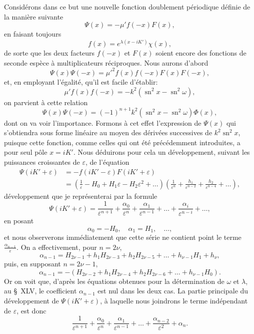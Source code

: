 \documentclass[11pt,leqno,oneside,letterpaper]{book}[2005/09/16]
\DeclareMathOperator{\sn}{sn}
\begin{document}
Consid\'erons dans ce but une nouvelle fonction doublement p\'eriodique
d\'efinie de la mani\`ere suivante
\[
\Psi(x) = -\mu' f(-x)F(x),
\]
en faisant toujours
\[
f(x) = e^{\lambda(x-iK')}\chi(x),
\]
de sorte que les deux facteurs $f(-x)$ et $F(x)$ soient encore des fonctions de
seconde esp\`ece \`a multiplicateurs r\'eciproques. Nous aurons d'abord
\[
\Psi(x)\Psi(-x) = \mu'^2 f(x)f(-x)F(x)F(-x),
\]
et, en employant l'\'egalit\'e, qu'il est facile d'\'etablir:
\[
\mu'f(x)f(-x) = -k^2(\sn^2x - \sn^2\omega),
\]
on parvient \`a cette relation
\[
\Psi(x)\Psi(-x) = (-1)^{n+1}k^2
  \left(\sn^2x-\sn^2\omega\right) \Phi(x),
\]
dont on va voir l'importance. Formons \`a cet effet l'expression de $\Psi(x)$
qui s'obtiendra sous forme lin\'eaire au moyen des d\'eriv\'ees successives
de $k^2\sn^2 x$, puisque cette fonction, comme celles qui ont \'et\'e pr\'ec\'edemment
introduites, a pour seul p\^ole $x = iK'$. Nous d\'eduirons pour cela un
d\'eveloppement, suivant les puissances croissantes de $\varepsilon$, de l'\'equation
\begin{align*}
\Psi(iK'+\varepsilon) &= -f(iK'-\varepsilon)F(iK'+\varepsilon) \\
  &= \left( \frac{1}{\varepsilon}-H_0+H_1\varepsilon-H_2\varepsilon^2+\ldots\right)
     \left( \frac{1}{\varepsilon^n} + \frac{h_1}{\varepsilon^{n-2}} +
            \frac{h_2}{\varepsilon^{n-4}} + \ldots \right),
\end{align*}
d\'eveloppement que je repr\'esenterai par la formule
\[
\Psi(iK'+\varepsilon) = \frac{1}{\varepsilon^{n+1}} + \frac{\alpha_0}{\varepsilon^n} +
  \frac{\alpha_1}{\varepsilon^{n-1}} + \ldots + \frac{\alpha_i}{\varepsilon^{n-i}} + \ldots,
\]
en posant
\[
\alpha_0 = -H_0, \quad \alpha_1 = H_1, \quad \ldots,
\]
et nous observerons imm\'ediatement que cette s\'erie ne contient point le
terme $\frac{\alpha_{n-1}}{\varepsilon}$. On a effectivement, pour $n = 2\nu$,
\[
\alpha_{n-1} = H_{2\nu-1} + h_1H_{2\nu-3} + h_2H_{2\nu-5} +
  \ldots + h_{\nu-1}H_1+h_{\nu},
\]
puis, en supposant $n = 2\nu-1$,
\[
\alpha_{n-1} = -(H_{2\nu-2} + h_1H_{2\nu-4} + h_2H_{2\nu-6} + \ldots + h_{\nu-1}H_0).
\]
Or on voit que, d'apr\`es les \'equations obtenues pour la d\'etermination de $\omega$
et $\lambda$, au \S~XLV, le coefficient $\alpha_{n-1}$ est nul dans les deux cas. La partie
principale du d\'eveloppement de $\Psi(iK'+\varepsilon)$, \`a laquelle nous joindrons le
terme ind\'ependant de $\varepsilon$, est donc
\[
\frac{1}{\varepsilon^{n+1}} + \frac{\alpha_0}{\varepsilon^n}
  +\frac{\alpha_1}{\varepsilon^{n-1}} + \ldots +
  \frac{\alpha_{n-2}}{\varepsilon^2} + \alpha_n.
\]
\end{document}
